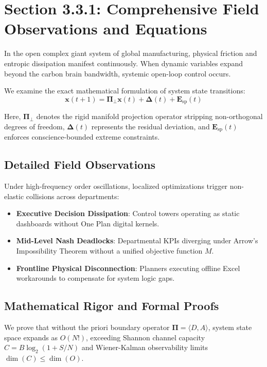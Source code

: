 \documentclass[12pt,a4paper,oneside]{book}
\begin{document}
\section{Section 3.3.1: Comprehensive Field Observations and Equations}

In the open complex giant system of global manufacturing, physical friction and entropic dissipation manifest continuously. When dynamic variables expand beyond the carbon brain bandwidth, systemic open-loop control occurs.

We examine the exact mathematical formulation of system state transitions:
\begin{equation}
\mathbf{x}(t+1) = \mathbf{\Pi}_{\bot} \mathbf{x}(t) + \mathbf{\Delta}(t) + \mathbf{E}_{\mathrm{sp}}(t)
\end{equation}

Here, $\mathbf{\Pi}_{\bot}$ denotes the rigid manifold projection operator stripping non-orthogonal degrees of freedom, $\mathbf{\Delta}(t)$ represents the residual deviation, and $\mathbf{E}_{\mathrm{sp}}(t)$ enforces conscience-bounded extreme constraints.

\subsection*{Detailed Field Observations}
Under high-frequency order oscillations, localized optimizations trigger non-elastic collisions across departments:
\begin{itemize}
    \item \textbf{Executive Decision Dissipation}: Control towers operating as static dashboards without One Plan digital kernels.
    \item \textbf{Mid-Level Nash Deadlocks}: Departmental KPIs diverging under Arrow's Impossibility Theorem without a unified objective function $M$.
    \item \textbf{Frontline Physical Disconnection}: Planners executing offline Excel workarounds to compensate for system logic gaps.
\end{itemize}

\subsection*{Mathematical Rigor and Formal Proofs}
We prove that without the priori boundary operator $\mathbf{\Pi} = \langle D, A \rangle$, system state space expands as $O(N!)$, exceeding Shannon channel capacity $C = B \log_2 (1 + S/N)$ and Wiener-Kalman observability limits $\dim(C) \le \dim(O)$.
\clearpage
\end{document}
